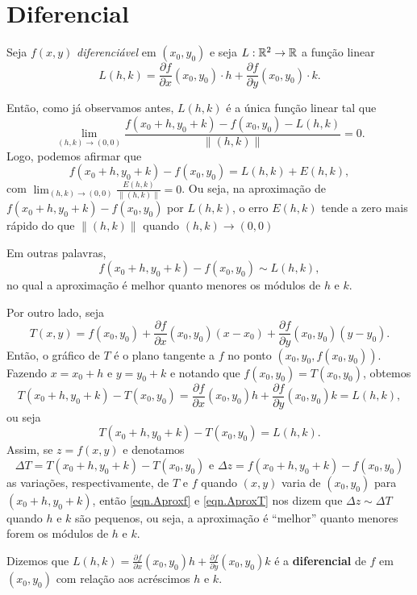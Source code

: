 \section{Diferencial}

Seja \(f(x,y)\) \textit{diferenciável} em \((x_0,y_0)\) e seja \(L:\mathbb{R}^2\to\mathbb{R}\) a função linear
    \begin{equation}\tag{*}
        L(h,k) = \frac{\partial f}{\partial x}(x_0,y_0)\cdot h + \frac{\partial f}{\partial y}(x_0,y_0)\cdot k.
    \end{equation}

Então, como já observamos antes, \(L(h,k)\) é a única função linear tal que \[\lim_{(h,k)\to(0,0)} \frac{f(x_0+h,y_0+k) - f(x_0,y_0) - L(h,k)}{\|(h,k)\|} = 0.\] Logo, podemos afirmar que \[f(x_0+h,y_0+k) - f(x_0,y_0) = L(h,k) + E(h,k),\] com \(\lim_{(h,k)\to(0,0)} \frac{E(h,k)}{\|(h,k)\|} = 0\). Ou seja, na aproximação de \(f(x_0+h,y_0+k) - f(x_0,y_0)\) por \(L(h,k)\), o erro \(E(h,k)\) tende a zero mais rápido do que \(\|(h,k)\|\) quando \((h,k)\to(0,0)\)

Em outras palavras,    
    \begin{equation}\label{eqn.Aproxf}
        f(x_0+h,y_0+k) - f(x_0,y_0) \sim L(h,k),
    \end{equation}
no qual a aproximação é melhor quanto menores os módulos de \(h\) e \(k\).

Por outro lado, seja \[T(x,y) = f(x_0,y_0) + \frac{\partial f}{\partial x}(x_0,y_0)(x-x_0) + \frac{\partial f}{\partial y}(x_0,y_0)(y-y_0). \] Então, o gráfico de \(T\) é o plano tangente a \(f\) no ponto \((x_0,y_0,f(x_0,y_0))\). Fazendo \(x = x_0 + h\) e \(y = y_0 + k\) e notando que \(f(x_0,y_0) = T(x_0,y_0)\), obtemos \[T(x_0+h,y_0+k) - T(x_0,y_0) = \frac{\partial f}{\partial x}(x_0,y_0)h + \frac{\partial f}{\partial y}(x_0,y_0)k = L(h,k),\] ou seja
    \begin{equation}\label{eqn.AproxT}
        T(x_0+h,y_0+k) - T(x_0,y_0) = L(h,k).
    \end{equation}
Assim, se \(z = f(x,y)\) e denotamos \[\Delta T = T(x_0+h,y_0+k) - T(x_0,y_0) \text{ e } \Delta z = f(x_0+h,y_0+k) - f(x_0,y_0)\] as variações, respectivamente, de \(T\) e \(f\) quando \((x,y)\) varia de \((x_0,y_0)\) para \((x_0+h,y_0+k)\), então \eqref{eqn.Aproxf} e \eqref{eqn.AproxT} nos dizem que \(\Delta z \sim \Delta T\) quando \(h\) e \(k\) são pequenos, ou seja, a aproximação é ``melhor'' quanto menores forem os módulos de \(h\) e \(k\).


\begin{definition}
Dizemos que \(L(h,k) = \frac{\partial f}{\partial x}(x_0,y_0)h + \frac{\partial f}{\partial y}(x_0,y_0)k\) é a \textbf{diferencial} de \(f\) em \((x_0,y_0)\) com relação aos acréscimos \(h\) e \(k\).
\end{definition}

